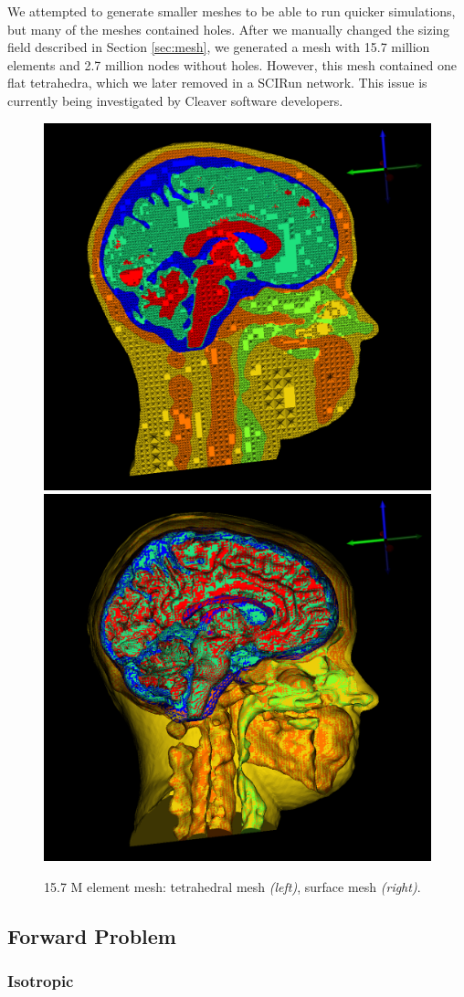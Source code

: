 We attempted to generate smaller meshes to be able to run quicker simulations, but many of the meshes contained holes. After we manually changed the sizing field described in Section \ref{sec:mesh}, we generated a mesh with 15.7 million elements and 2.7 million nodes without holes. However, this mesh contained one flat tetrahedra, which we later removed in a SCIRun network. This issue is currently being investigated by Cleaver software developers.

\begin{figure}[H]
\begin{center}
\includegraphics[width=.49\textwidth]{Figures/smallmesh_2}
\includegraphics[width=.49\textwidth]{Figures/smallmesh_surface}
\caption{15.7 M element mesh: tetrahedral mesh \textit{(left)}, surface mesh \textit{(right)}.}
\label{fig:smallmesh}
\end{center}
\end{figure}

\subsection{Forward Problem}

\subsubsection{Isotropic}

